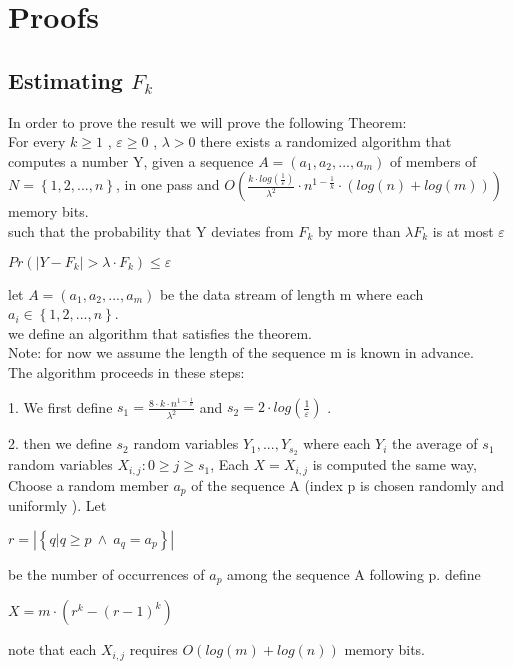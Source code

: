 \documentclass{article}
\begin{document}
\section{Proofs}

\subsection{Estimating \(F_{k}\)}

In order to prove the result  we will prove the following Theorem:\\
For every \(k \geq 1\) ,  \(\varepsilon \geq 0\) ,  \( \lambda > 0\)  there exists a randomized algorithm that computes a number Y, given a sequence \(A = (a_{1}, a_{2}, ..., a_{m}) \) of members of \(N = \left\{1, 2, ..., n \right\}\), in one pass and \(O(\frac{k\cdot log(\frac{1}{\varepsilon})}{\lambda ^{2}}\cdot n^{1 - \frac{1}{k}}\cdot (log(n) + log(m)))\) memory bits.\\
such that the probability that Y deviates from \(F_{k}\) by more than \(\lambda F_{k}\) is at most \(\varepsilon\)
\begin{center}
    \(Pr(\left|Y - F_{k} \right|> \lambda \cdot F_{k}) \leq \varepsilon \)
\end{center}

let \(A = (a_{1}, a_{2}, ..., a_{m}) \) be the data stream of length m where each \(a_{i} \in \left\{1, 2, ..., n \right\}\).\\
we define an algorithm that satisfies the theorem.\\
Note: for now we assume the length of the sequence m is known in advance.\\
The algorithm proceeds in these steps:

1. We first define \(s_{1} = \frac{8\cdot k\cdot n^{1-\frac{1}{k}}}{\lambda^{2}}\) and \(s_{2} = 2\cdot log(\frac{1}{\varepsilon })\) .

2. then we define \(s_{2}\) random variables \(Y_{1}, ..., Y_{s_{2}}\) where each \(Y_{i}\) the average of \(s_{1}\) random variables \(X_{i,j}: 0 \geq j \geq s_{1}\), Each \(X = X_{i,j}\) is computed the same way, Choose a random member \(a_{p}\) of the sequence A (index p is chosen randomly and uniformly ). Let
\begin{center}
    \(r = \left| \left\{ q| q\geq p\:\wedge\: a_{q}=a_{p} \right\}\right|\)
\end{center}
be the number of occurrences of \(a_{p}\) among the sequence A following p.
define
\begin{center}
    \(X = m\cdot(r^{k} - (r-1)^{k})\)
\end{center}
note that each \(X_{i,j}\) requires \(O(log(m) + log(n))\) memory bits.\\
\end{document}

